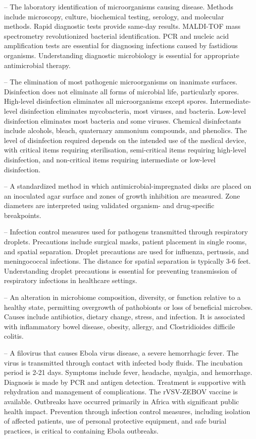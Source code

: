 -- The laboratory identification of microorganisms causing disease. Methods include microscopy, culture, biochemical testing, serology, and molecular methods. Rapid diagnostic tests provide same-day results. MALDI-TOF mass spectrometry revolutionized bacterial identification. PCR and nucleic acid amplification tests are essential for diagnosing infections caused by fastidious organisms. Understanding diagnostic microbiology is essential for appropriate antimicrobial therapy.

-- The elimination of most pathogenic microorganisms on inanimate surfaces. Disinfection does not eliminate all forms of microbial life, particularly spores. High-level disinfection eliminates all microorganisms except spores. Intermediate-level disinfection eliminates mycobacteria, most viruses, and bacteria. Low-level disinfection eliminates most bacteria and some viruses. Chemical disinfectants include alcohols, bleach, quaternary ammonium compounds, and phenolics. The level of disinfection required depends on the intended use of the medical device, with critical items requiring sterilisation, semi-critical items requiring high-level disinfection, and non-critical items requiring intermediate or low-level disinfection.

-- A standardized method in which antimicrobial-impregnated disks are placed on an inoculated agar surface and zones of growth inhibition are measured. Zone diameters are interpreted using validated organism- and drug-specific breakpoints.

-- Infection control measures used for pathogens transmitted through respiratory droplets. Precautions include surgical masks, patient placement in single rooms, and spatial separation. Droplet precautions are used for influenza, pertussis, and meningococcal infections. The distance for spatial separation is typically 3-6 feet. Understanding droplet precautions is essential for preventing transmission of respiratory infections in healthcare settings.

-- An alteration in microbiome composition, diversity, or function relative to a healthy state, permitting overgrowth of pathobionts or loss of beneficial microbes. Causes include antibiotics, dietary change, stress, and infection. It is associated with inflammatory bowel disease, obesity, allergy, and Clostridioides difficile colitis.

-- A filovirus that causes Ebola virus disease, a severe hemorrhagic fever. The virus is transmitted through contact with infected body fluids. The incubation period is 2-21 days. Symptoms include fever, headache, myalgia, and hemorrhage. Diagnosis is made by PCR and antigen detection. Treatment is supportive with rehydration and management of complications. The rVSV-ZEBOV vaccine is available. Outbreaks have occurred primarily in Africa with significant public health impact. Prevention through infection control measures, including isolation of affected patients, use of personal protective equipment, and safe burial practices, is critical to containing Ebola outbreaks.

